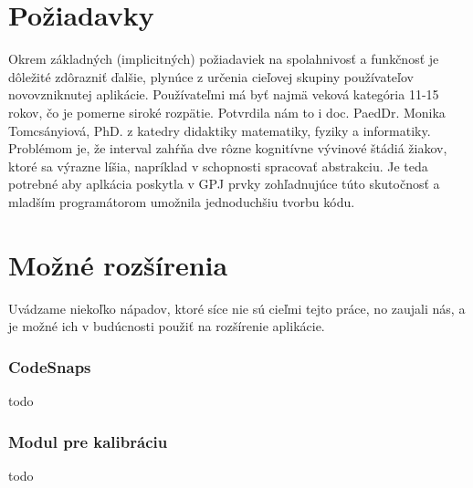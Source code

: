 \section{Požiadavky}
Okrem základných (implicitných) požiadaviek na spolahnivosť a funkčnosť je dôležité zdôrazniť ďalšie, plynúce z určenia cieľovej skupiny používateľov novovzniknutej aplikácie. Používateľmi má byť najmä veková kategória 11-15 rokov, čo je pomerne siroké rozpätie. Potvrdila nám to i doc. PaedDr. Monika Tomcsányiová, PhD. z katedry didaktiky matematiky, fyziky a informatiky. Problémom je, že interval zahŕňa dve rôzne kognitívne vývinové štádiá žiakov, ktoré sa výrazne líšia, napríklad v schopnosti spracovať abstrakciu. Je teda potrebné aby aplkácia poskytla v GPJ prvky zohľadnujúce túto skutočnosť a mladším programátorom umožnila jednoduchšiu tvorbu kódu.

\section{Možné rozšírenia}
Uvádzame niekoľko nápadov, ktoré síce nie sú cieľmi tejto práce, no zaujali nás, a je možné ich v budúcnosti použiť na rozšírenie aplikácie.

\subsubsection{CodeSnaps}
todo

\subsubsection{Modul pre kalibráciu}
todo
